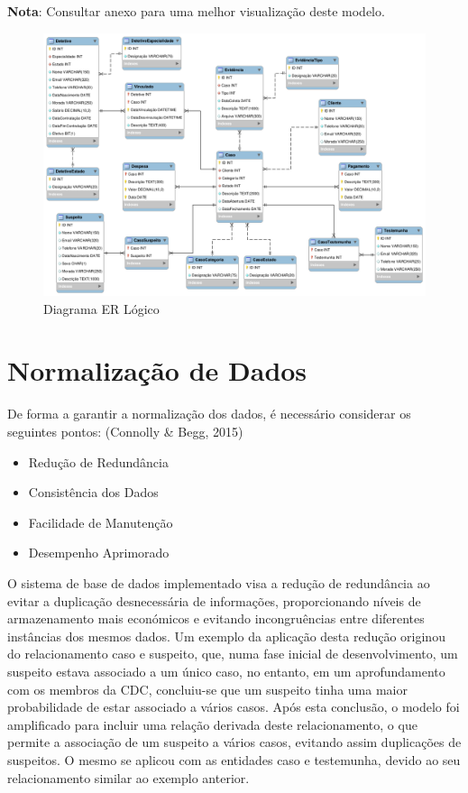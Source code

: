 \documentclass[a4paper,12pt]{scrreprt}
\begin{document}
    \textbf{Nota}: Consultar anexo  para uma melhor visualização deste modelo.
    \clearpage
    \begin{figure}[!ht]
        \centering
        \includegraphics[scale=0.70, angle=270]{images/logico.png}
        \caption{Diagrama ER Lógico}
        \label{fig:4.1}
    \end{figure}

    \clearpage
    \section{Normalização de Dados}
        De forma a garantir a normalização dos dados, é necessário considerar os seguintes pontos: \cite{DatabaseSystems} (Connolly \& Begg, 2015)
        \begin{itemize}
            \item Redução de Redundância
            \item Consistência dos Dados
            \item Facilidade de Manutenção
            \item Desempenho Aprimorado
        \end{itemize}
        O sistema de base de dados implementado visa a redução de redundância ao evitar a duplicação desnecessária de informações, proporcionando níveis de armazenamento mais económicos e evitando incongruências entre diferentes instâncias dos mesmos dados. Um exemplo da aplicação desta redução originou do relacionamento caso e suspeito, que, numa fase inicial de desenvolvimento, um suspeito estava associado a um único caso, no entanto, em um aprofundamento com os membros da CDC, concluiu-se que um suspeito tinha uma maior probabilidade de estar associado a vários casos. Após esta conclusão, o modelo foi amplificado para incluir uma relação derivada deste relacionamento, o que permite a associação de um suspeito a vários casos, evitando assim duplicações de suspeitos. O mesmo se aplicou com as entidades caso e testemunha, devido ao seu relacionamento similar ao exemplo anterior.
\end{document}

